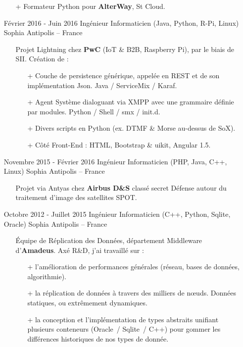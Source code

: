 \documentclass{res}
\begin{document}
\begin{resume}
\begin{itemize}
\begin{itemize}
			\item[+] Formateur Python pour \textbf{AlterWay}, St Cloud. 
		\end{itemize}
		\item[] F\'evrier 2016 - Juin 2016 \tabto{5cm} Ing\'enieur Informaticien (Java, Python, R-Pi, Linux) \hfill Sophia Antipolis -- France
		\begin{itemize}
			\item[] Projet Lightning chez \textbf{PwC} (IoT \& B2B, Raspberry Pi), par le biais de SII. Cr\'eation de :
			\begin{itemize}
				\item[+] Couche de persistence g\'en\'erique, appel\'ee en REST et de son impl\'ementation Json. Java / ServiceMix / Karaf.
				\item[+] Agent Syst\`eme dialoguant via XMPP avec une grammaire d\'efinie par modules. Python / Shell / smx / init.d.
				\item[+] Divers scripts en Python (ex. DTMF \& Morse au-dessus de SoX). 
				\item[+] C\^ot\'e Front-End : HTML, Bootstrap \& uikit, Angular 1.5.
			\end{itemize}
		\end{itemize}
		\item[] Novembre 2015 - F\'evrier 2016 \tabto{5cm} Ing\'enieur Informaticien (PHP, Java, C++, Linux) \hfill Sophia Antipolis -- France
		\begin{itemize}
			\item[] Projet via Antyas chez \textbf{Airbus D\&S} class\'e secret D\'efense autour du traitement d'image des satellites SPOT.
		\end{itemize}
		\item[] Octobre 2012 - Juillet 2015 \tabto{5cm} Ing\'enieur Informaticien (C++, Python, Sqlite, Oracle)  \hfill Sophia Antipolis -- France
		\begin{itemize}
			\item[] \'Equipe de R\'eplication des Donn\'ees, d\'epartement Middleware d'\textbf{Amadeus}. Ax\'e R\&D, j'ai travaill\'e sur :
			\begin{itemize}
				\item[+] l'am\'elioration de performances g\'en\'erales (r\'eseau, bases de donn\'ees, algorithmie).
				\item[+] la r\'eplication de donn\'ees \`a travers des milliers de n\oe{}uds. Donn\'ees statiques, ou extr\^emement dynamiques.
				\item[+] la conception et l'impl\'ementation de types abstraits unifiant plusieurs conteneurs (Oracle~/ Sqlite~/ C++) pour gommer les diff\'erences historiques de nos types de donn\'ee.

\end{itemize}
\end{itemize}
\end{itemize}
\end{resume}
\end{document}
